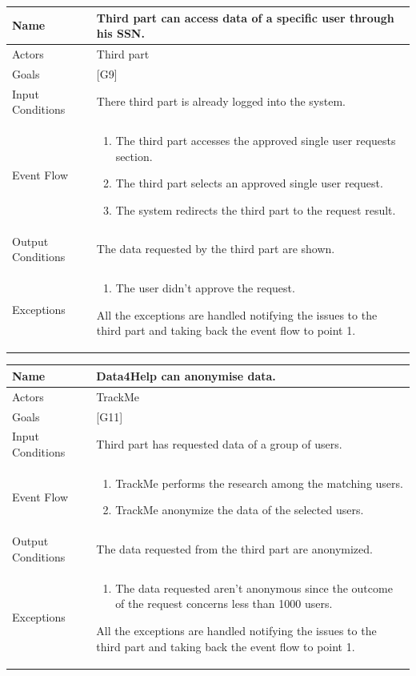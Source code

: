 \documentclass{article}
\begin{document}
\begin{center}
    \begin{tabular}{ | l | p{10cm} |}
    \hline
    Name & Third part can access data of a specific user through his SSN.\\ \hline
    Actors & Third part\\ \hline
   	Goals & {[G9]}\\ \hline
    Input Conditions & There third part is already logged into the system.\\ \hline
    Event Flow & \begin{enumerate}
    	\item The third part accesses the approved single user requests section.
    	\item The third part selects an approved single user request. 
    	\item The system redirects the third part to the request result.
    \end{enumerate} \\ \hline
    Output Conditions & The data requested by the third part are shown.  \\ \hline
    Exceptions & \begin{enumerate}
   \item The user didn't approve the request.
\end{enumerate} All the exceptions are handled notifying the issues to the third part and taking back the event flow to point 1.    \\ \hline
    \end{tabular}
\end{center}

\begin{center}
    \begin{tabular}{ | l | p{10cm} |}
    \hline
    Name & Data4Help can anonymise data. \\ \hline
    Actors & TrackMe\\ \hline
   	Goals & {[G11]}\\ \hline
    Input Conditions & Third part has requested data of a group of users.\\ \hline
    Event Flow & \begin{enumerate}
		\item TrackMe performs the research among the matching users.
		\item TrackMe anonymize the data of the selected users.
    \end{enumerate} \\ \hline
    Output Conditions & The data requested from the third part are anonymized. \\ \hline
    Exceptions & \begin{enumerate}
  		\item The data requested aren’t anonymous since the outcome of the request concerns less than 1000 users.
\end{enumerate} All the exceptions are handled notifying the issues to the third part and taking back the event flow to point 1.    \\ \hline
    \end{tabular}
\end{center}
\end{document}
